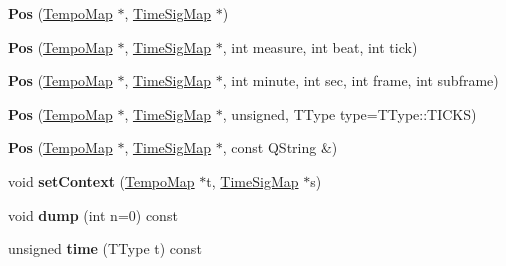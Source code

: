 \begin{DoxyCompactItemize}
\item 
\mbox{\label{class_ms_1_1_pos_a8e7ad7c8572110023be07df397a1f2b3}} 
{\bfseries Pos} (\hyperlink{class_ms_1_1_tempo_map}{Tempo\+Map} $\ast$, \hyperlink{class_ms_1_1_time_sig_map}{Time\+Sig\+Map} $\ast$)
\item 
\mbox{\label{class_ms_1_1_pos_aec814a7dbefd2608131814333128bedf}} 
{\bfseries Pos} (\hyperlink{class_ms_1_1_tempo_map}{Tempo\+Map} $\ast$, \hyperlink{class_ms_1_1_time_sig_map}{Time\+Sig\+Map} $\ast$, int measure, int beat, int tick)
\item 
\mbox{\label{class_ms_1_1_pos_a52cd25a065cf49b2486de08f6a537288}} 
{\bfseries Pos} (\hyperlink{class_ms_1_1_tempo_map}{Tempo\+Map} $\ast$, \hyperlink{class_ms_1_1_time_sig_map}{Time\+Sig\+Map} $\ast$, int minute, int sec, int frame, int subframe)
\item 
\mbox{\label{class_ms_1_1_pos_a276f1869061964becea93d8f86c67146}} 
{\bfseries Pos} (\hyperlink{class_ms_1_1_tempo_map}{Tempo\+Map} $\ast$, \hyperlink{class_ms_1_1_time_sig_map}{Time\+Sig\+Map} $\ast$, unsigned, T\+Type type=T\+Type\+::\+T\+I\+C\+KS)
\item 
\mbox{\label{class_ms_1_1_pos_a7802556e10ff0b41a9e14529c88eddb9}} 
{\bfseries Pos} (\hyperlink{class_ms_1_1_tempo_map}{Tempo\+Map} $\ast$, \hyperlink{class_ms_1_1_time_sig_map}{Time\+Sig\+Map} $\ast$, const Q\+String \&)
\item 
\mbox{\label{class_ms_1_1_pos_abe79d73d138cd3ccece93f2985167afa}} 
void {\bfseries set\+Context} (\hyperlink{class_ms_1_1_tempo_map}{Tempo\+Map} $\ast$t, \hyperlink{class_ms_1_1_time_sig_map}{Time\+Sig\+Map} $\ast$s)
\item 
\mbox{\label{class_ms_1_1_pos_a3bfd3e936757aba63dfca25bb866513f}} 
void {\bfseries dump} (int n=0) const
\item 
\mbox{\label{class_ms_1_1_pos_a61d47c57e729b73a0802fb00a84483b5}} 
unsigned {\bfseries time} (T\+Type t) const
\item 
\mbox{\label{class_ms_1_1_pos_a03df61e11a4e61ea5fa493a6c1732a0a}} 

\end{DoxyCompactItemize}
